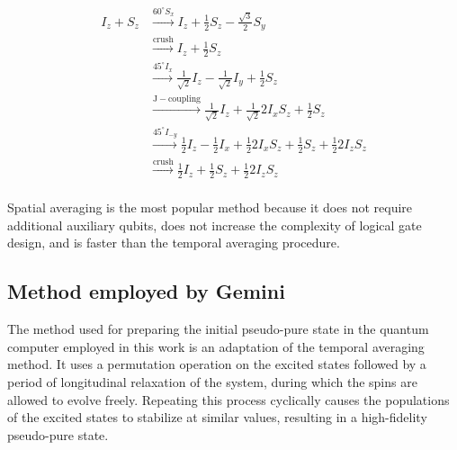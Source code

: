 \begin{equation}
\begin{aligned}
    I_z + S_z &\xrightarrow{60^\circ S_x}I_z + \frac{1}{2}S_z-\frac{\sqrt{3}}{2}S_y \\
    &\xrightarrow{\mathrm{crush}} I_z + \frac{1}{2}S_z\\
    &\xrightarrow{45^\circ I_x} \frac{1}{\sqrt{2}}I_z - \frac{1}{\sqrt{2}}I_y+\frac{1}{2} S_z\\
    &\xrightarrow{\mathrm{J-coupling}} \frac{1}{\sqrt{2}}I_z+\frac{1}{\sqrt{2}}2I_x S_z+\frac{1}{2}S_z\\
    &\xrightarrow{45^\circ I_{-y}} \frac{1}{2}I_z-\frac{1}{2}I_x+\frac{1}{2}2I_x S_z+\frac{1}{2}S_z+\frac{1}{2}2I_z S_z\\
    &\xrightarrow{\mathrm{crush}} \frac{1}{2}I_z+\frac{1}{2}S_z+\frac{1}{2}2I_z S_z\\
\end{aligned}
\label{eq:spatial_averaging}
\end{equation}

Spatial averaging is the most popular method because it does not require additional auxiliary qubits, does not increase the complexity of logical gate design, and is faster than the temporal averaging procedure.

\subsection{Method employed by Gemini}
\label{subsec:gemini_initialization}

The method used for preparing the initial pseudo-pure state in the quantum computer employed in this work is an adaptation of the temporal averaging method. It uses a permutation operation on the excited states followed by a period of longitudinal relaxation of the system, during which the spins are allowed to evolve freely. Repeating this process cyclically causes the populations of the excited states to stabilize at similar values, resulting in a high-fidelity pseudo-pure state.


